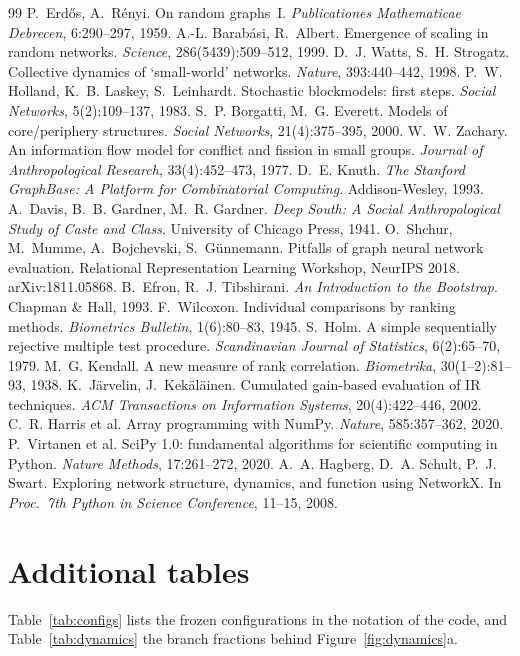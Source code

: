 \documentclass[11pt,a4paper]{article}
\theoremstyle{definition}
\theoremstyle{plain}
\begin{document}
\begin{thebibliography}{99}
 P.~Erdős, A.~Rényi. On random graphs~I. \emph{Publicationes Mathematicae Debrecen}, 6:290--297, 1959.
 A.-L. Barabási, R.~Albert. Emergence of scaling in random networks. \emph{Science}, 286(5439):509--512, 1999.
 D.~J. Watts, S.~H. Strogatz. Collective dynamics of `small-world' networks. \emph{Nature}, 393:440--442, 1998.
 P.~W. Holland, K.~B. Laskey, S.~Leinhardt. Stochastic blockmodels: first steps. \emph{Social Networks}, 5(2):109--137, 1983.
 S.~P. Borgatti, M.~G. Everett. Models of core/periphery structures. \emph{Social Networks}, 21(4):375--395, 2000.
 W.~W. Zachary. An information flow model for conflict and fission in small groups. \emph{Journal of Anthropological Research}, 33(4):452--473, 1977.
 D.~E. Knuth. \emph{The Stanford GraphBase: A Platform for Combinatorial Computing}. Addison-Wesley, 1993.
 A.~Davis, B.~B. Gardner, M.~R. Gardner. \emph{Deep South: A Social Anthropological Study of Caste and Class}. University of Chicago Press, 1941.
 O.~Shchur, M.~Mumme, A.~Bojchevski, S.~Günnemann. Pitfalls of graph neural network evaluation. Relational Representation Learning Workshop, NeurIPS 2018. arXiv:1811.05868.
 B.~Efron, R.~J. Tibshirani. \emph{An Introduction to the Bootstrap}. Chapman \& Hall, 1993.
 F.~Wilcoxon. Individual comparisons by ranking methods. \emph{Biometrics Bulletin}, 1(6):80--83, 1945.
 S.~Holm. A simple sequentially rejective multiple test procedure. \emph{Scandinavian Journal of Statistics}, 6(2):65--70, 1979.
 M.~G. Kendall. A new measure of rank correlation. \emph{Biometrika}, 30(1--2):81--93, 1938.
 K.~Järvelin, J.~Kekäläinen. Cumulated gain-based evaluation of IR techniques. \emph{ACM Transactions on Information Systems}, 20(4):422--446, 2002.
 C.~R. Harris et al. Array programming with NumPy. \emph{Nature}, 585:357--362, 2020.
 P.~Virtanen et al. SciPy 1.0: fundamental algorithms for scientific computing in Python. \emph{Nature Methods}, 17:261--272, 2020.
 A.~A. Hagberg, D.~A. Schult, P.~J. Swart. Exploring network structure, dynamics, and function using NetworkX. In \emph{Proc.\ 7th Python in Science Conference}, 11--15, 2008.
\end{thebibliography}

\appendix
\section{Additional tables}\label{app:tables}

Table~\ref{tab:configs} lists the frozen configurations in the notation of the code, and Table~\ref{tab:dynamics} the branch fractions behind Figure~\ref{fig:dynamics}a.

\TabConfigs

\TabDynamics
\end{document}
